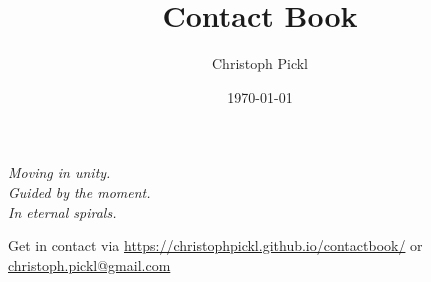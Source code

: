 \documentclass[11pt]{book}
\title{Contact Book}
\date{\today}
\author{Christoph Pickl}
\begin{document}

\maketitle

\tableofcontents
\vfill
\begin{center}
	\textit{Moving in unity.}\\
	\textit{Guided by the moment.}\\
	\textit{In eternal spirals.}
\end{center}
\vfill
\noindent
\footnotesize{Get in contact via \url{https://christophpickl.github.io/contactbook/} or \\ \href{mailto:christoph.pickl@gmail.com}{christoph.pickl@gmail.com}}
\newpage

















\printglossaries
\end{document}
